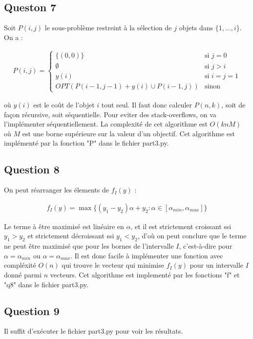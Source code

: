 \documentclass[paper=a4, fontsize=11pt]{scrartcl} %
\numberwithin{equation}{section} %
\numberwithin{figure}{section} %
\numberwithin{table}{section} %
\begin{document}
\subsection{Queston 7}
Soit $P(i, j)$ le sous-probl\`eme restreint \`a la s\'election de $j$ objets dans $\{1, ..., i\}$. On a :

\begin{align}
P(i, j) = \begin{cases} \{(0,0)\}&\mbox{si } j = 0 \\ \emptyset &\mbox{si }  j > i  \\ y(i) &\mbox{si } i = j = 1 \\ OPT(P(i-1, j-1) + y(i) \cup P(i-1, j)) &\mbox{sinon}\end{cases}
\end{align}

o\`u $y(i)$ est le co\^ut de l'objet $i$ tout seul. Il faut donc calculer $P(n, k)$, soit de fa\c con r\'ecursive, soit s\'equentielle. Pour eviter des stack-overflows, on va l'impl\'ementer s\'equentiellement. La complexit\'e de cet algorithme est $O(knM)$ o\`u $M$ est une borne sup\'erieure sur la valeur d'un objectif. Cet algorithme est impl\'ement\'e par la fonction "P" dans le fichier part3.py.

\subsection{Question 8}
On peut r\'earranger les \'elements de $f_I(y)$ :

\begin{align}
f_I(y) = \max\{ (y_1 - y_2)\alpha + y_2:\alpha\in[\alpha_{min},\alpha_{max}]\}	
\end{align}

Le terme \`a \^etre maximis\'e est lin\'eaire en $\alpha$, et il est strictement croissant ssi $y_1 > y_2$ et strictement d\'ecroissant ssi $y_1 < y_2$, d'o\`u on peut conclure que le terme ne peut \^etre maximis\'e que pour les bornes de l'intervalle $I$, c'est-\`a-dire pour $\alpha = \alpha_{min}$ ou $\alpha=\alpha_{max}$. Il est donc facile \`a impl\'ementer une fonction avec compl\'exit\'e $O(n)$ qui trouve le vecteur qui minimise $f_I(y)$ pour un intervalle $I$ donn\'e parmi $n$ vecteurs. Cet algorithme est implement\'e par les fonctions "f" et "q8" dans le fichier part3.py.

\subsection{Question 9}
Il suffit d'ex\'ecuter le fichier part3.py pour voir les r\'esultats.
\end{document}
